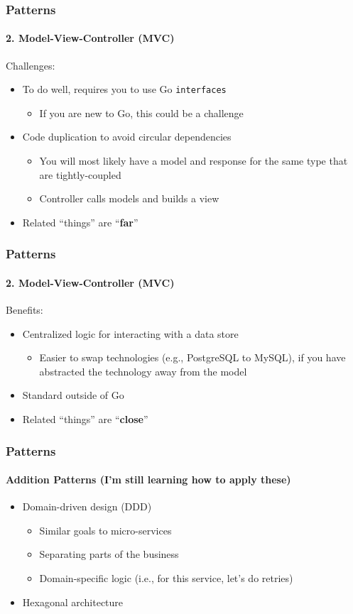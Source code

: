 \begin{frame}[fragile]
  \frametitle{Patterns}
  \framesubtitle{2. Model-View-Controller (MVC)}

  Challenges:
  \begin{itemize}
    \pause
    \item To do well, requires you to use Go \texttt{interfaces}
    \begin{itemize}
      \item If you are new to Go, this could be a challenge
    \end{itemize}
    \pause
    \item Code duplication to avoid circular dependencies
    \begin{itemize}
      \item You will most likely have a model and response for the same type that are tightly-coupled
      \item Controller calls models and builds a view
    \end{itemize}
    \pause
    \item Related ``things'' are ``\textbf{far}''
  \end{itemize}
\end{frame}

\begin{frame}[fragile]
  \frametitle{Patterns}
  \framesubtitle{2. Model-View-Controller (MVC)}

  Benefits:
  \begin{itemize}
    \pause
    \item Centralized logic for interacting with a data store
    \begin{itemize}
      \item Easier to swap technologies (e.g., PostgreSQL to MySQL), if you have abstracted the technology away from the model
    \end{itemize}
    \pause
    \item Standard outside of Go
    \pause
    \item Related ``things'' are ``\textbf{close}''
  \end{itemize}

\end{frame}

\begin{frame}[fragile]
  \frametitle{Patterns}
  \framesubtitle{Addition Patterns (I'm still learning how to apply these)}

  \begin{itemize}
    \item Domain-driven design (DDD)
      \begin{itemize}
        \item Similar goals to micro-services
        \item Separating parts of the business
        \item Domain-specific logic (i.e., for this service, let's do retries)
      \end{itemize}
    \item Hexagonal architecture
  \end{itemize}
\end{frame}


